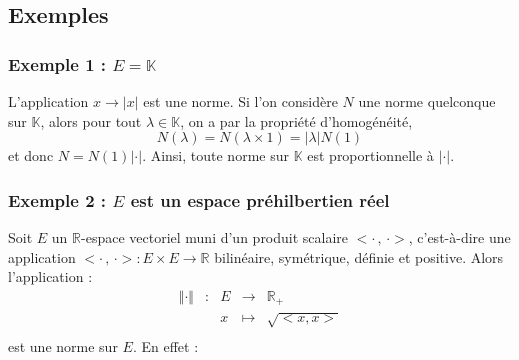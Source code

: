 \documentclass[french,11pt,twoside]{VcCours}
\begin{document}
 \subsection{Exemples}
 \subsubsection{Exemple 1 : \texorpdfstring{$E= \mathbb{K}$}{E=IK}}

L'application $x \rightarrow \vert x \vert$ est une norme. Si l'on considère $N$ une norme quelconque sur $\mathbb{K}$, alors pour tout $\lambda \in \mathbb{K}$, on a par la propriété d'homogénéité,
$$ N(\lambda) = N( \lambda \times 1) = \vert \lambda \vert N(1)$$
et donc $N =N(1) \vert \cdot \vert$. Ainsi, toute norme sur $\mathbb{K}$ est proportionnelle à $\vert \cdot \vert$.

\subsubsection{Exemple 2 : \texorpdfstring{$E$}{E} est un espace préhilbertien réel}

Soit $E$ un $\mathbb{R}$-espace vectoriel muni d'un produit scalaire $<\cdot \, , \,\cdot>$, c'est-à-dire une application $<\cdot \, , \,\cdot> : E \times E \rightarrow \mathbb{R}$ bilinéaire, symétrique, définie et positive. Alors l'application :
$$ \begin{array}{ccccl}
\Vert \cdot \Vert & : & E & \rightarrow & \mathbb{R}_+ \\
& & x & \mapsto & \sqrt{<x,x>} \\
\end{array}$$ 
est une norme sur $E$. En effet :
\end{document}

